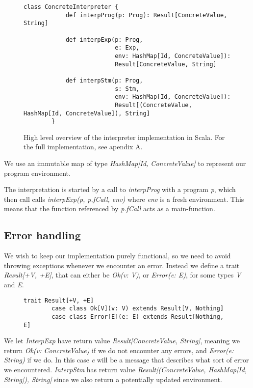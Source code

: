\begin{figure}[!h]
	\begin{lstlisting}[style=simple]
		class ConcreteInterpreter {
			def interpProg(p: Prog): Result[ConcreteValue, String]
			
			def interpExp(p: Prog,
						  e: Exp, 
						  env: HashMap[Id, ConcreteValue]): 
						  Result[ConcreteValue, String]
						  
			def interpStm(p: Prog,
						  s: Stm,
						  env: HashMap[Id, ConcreteValue]):
						  Result[(ConcreteValue, HashMap[Id, ConcreteValue]), String]
		}
	\end{lstlisting}
	\caption{High level overview of the interpreter implementation in Scala. For the full implementation, see apendix A.}
\end{figure}
\newpage
We use an immutable map of type \textsl{HashMap[Id, ConcreteValue]} to represent our program environment.

The interpretation is started by a call to \textsl{interpProg} with a program \textsl{p}, which then call calls \textsl{interpExp(p, p.fCall, env)} where \textsl{env} is a fresh environment. This means that the function referenced by \textsl{p.fCall} acts as a main-function. 

\subsection{Error handling}
We wish to keep our implementation purely functional, so we need to avoid throwing exceptions whenever we encounter an error. Instead we define a trait \textsl{Result[+V, +E]}, that can either be \textsl{Ok(v: V)},  or \textsl{Error(e: E)}, for some types \textsl{V} and \textsl{E}.

\begin{figure}[!h]
	\begin{lstlisting}[style=simple]
		trait Result[+V, +E]
		case class Ok[V](v: V) extends Result[V, Nothing]
		case class Error[E](e: E) extends Result[Nothing, E]
	\end{lstlisting}
\end{figure}

We let \textsl{InterpExp} have return value \textsl{Result[ConcreteValue, String]}, meaning we return \textsl{Ok(v: ConcreteValue)} if we do not encounter any errors, and \textsl{Error(e: String)} if we do. In this case \textsl{e} will be a message that describes what sort of error we encountered. \textsl{InterpStm} has return value 
 \textsl{Result[(ConcreteValue, HashMap[Id, String]), String]} since we also return a potentially updated environment. 

